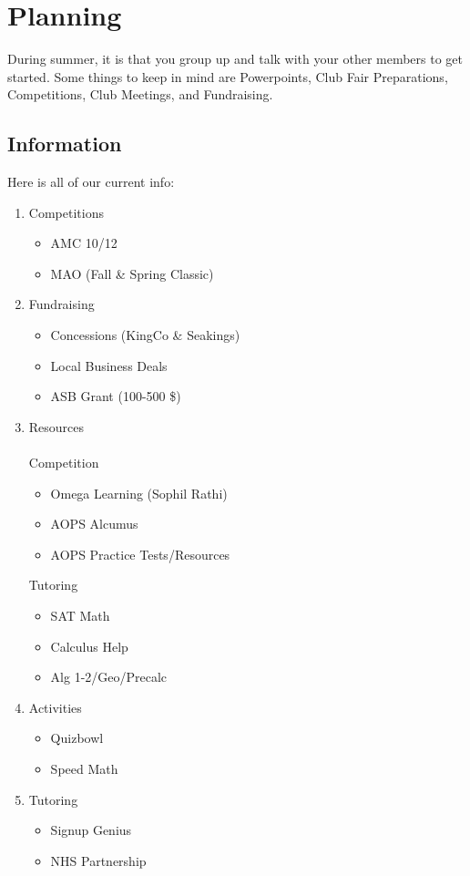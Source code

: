 \chapter{Planning}

During summer, it is  that you group up and
talk with your other members to get started. Some things to keep in mind
are Powerpoints, Club Fair Preparations, Competitions, Club Meetings, and Fundraising.

\section{Information}
Here is all of our current info:

\begin{enumerate}
    \item Competitions
        \begin{itemize}
            \item AMC 10/12
            \item MAO (Fall \& Spring Classic)
        \end{itemize}
    \item Fundraising
        \begin{itemize}
            \item Concessions (KingCo \& Seakings)
            \item Local Business Deals
            \item ASB Grant (100-500 \$)
        \end{itemize}
    \item Resources \\\\
        Competition
         \begin{itemize}
            \item Omega Learning (Sophil Rathi)
            \item AOPS Alcumus
            \item AOPS Practice Tests/Resources
        \end{itemize}
        Tutoring
        \begin{itemize}
            \item SAT Math
            \item Calculus Help
            \item Alg 1-2/Geo/Precalc
        \end{itemize}
    \item Activities
        \begin{itemize}
            \item Quizbowl
            \item Speed Math
        \end{itemize}
    \item Tutoring
        \begin{itemize}
            \item Signup Genius
            \item NHS Partnership
        \end{itemize}
\end{enumerate}